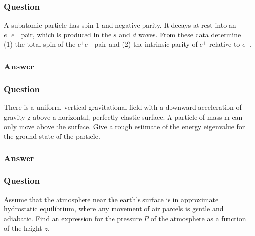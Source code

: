 \subsubsection{Question}
A subatomic particle has spin 1 and negative parity. It decays at rest into an $e^+ e^-$ pair, which is produced in the $s$ and $d$ waves. From these data determine (1) the total spin of the $e^+ e^-$ pair and (2) the intrinsic parity of $e^+$ relative to $e^-$.
\subsubsection{Answer}



\subsubsection{Question}

There is a uniform, vertical gravitational field with a downward acceleration of gravity g above a horizontal, perfectly elastic surface. A particle of mass m can only move above the surface. Give a rough estimate of the energy eigenvalue for the ground state of the particle.

\subsubsection{Answer}





\subsubsection{Question}

Assume that the atmosphere near the earth's surface is in approximate
hydrostatic equilibrium, where any movement of air parcels is gentle and
adiabatic. Find an expression for the pressure $P$ of the atmosphere as a
function of the height $z$.

